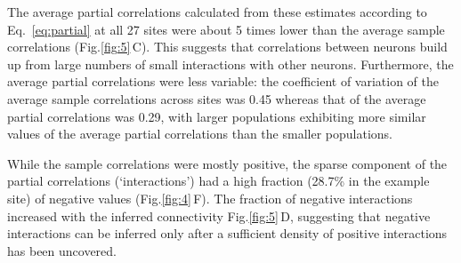 \documentclass[10pt]{article}
\newcommand{\sq}[1]{\lq#1\rq}
\newcommand{\figref}[2]{Fig.\;\ref{fig:#1}\,#2}
\begin{document}
The average partial correlations calculated from these estimates according to Eq.~\ref{eq:partial} at all 27 sites were about 5 times lower than the average sample correlations (\figref{5}{C}). This suggests that correlations between neurons build up from large numbers of small interactions with other neurons. Furthermore, the average partial correlations were less variable: the coefficient of variation of the average sample correlations across sites was 0.45 whereas that of the average partial correlations was 0.29, with larger populations exhibiting more similar values of the average partial correlations than the smaller populations. 

While the sample correlations were mostly positive, the sparse component of the partial correlations (\sq{interactions}) had a high fraction (28.7\% in the example site) of negative values (\figref{4}{F}). The fraction of negative interactions increased with the inferred connectivity \figref{5}{D}, suggesting that negative interactions can be inferred only after a sufficient density of positive interactions has been uncovered.
\end{document}
